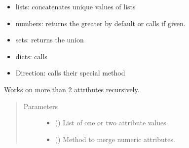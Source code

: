 \documentclass[letterpaper,10pt,english]{sphinxmanual}
\begin{document}
\begin{fulllineitems}
\begin{fulllineitems}
\begin{itemize}
\item {} 
lists: concatenates unique values of lists

\item {} 
numbers: returns the greater by default
or calls  if given.

\item {} 
sets: returns the union

\item {} 
dicts: calls 

\item {} 
Direction: calls their special  method

\end{itemize}

Works on more than 2 attributes recursively.
\begin{quote}\begin{description}
\item[{Parameters}] \leavevmode\begin{itemize}
\item {} 
 () \textendash{} List of one or two attribute values.

\item {} 
 () \textendash{} Method to merge numeric attributes.

\end{itemize}

\end{description}\end{quote}

\end{fulllineitems}


\begin{fulllineitems}
\label{\detokenize{main:pypath.main.PyPath.communities}}
\end{fulllineitems}


\begin{fulllineitems}
\label{\detokenize{main:pypath.main.PyPath.complex_comembership_network}}
\end{fulllineitems}


\end{fulllineitems}
\end{document}
